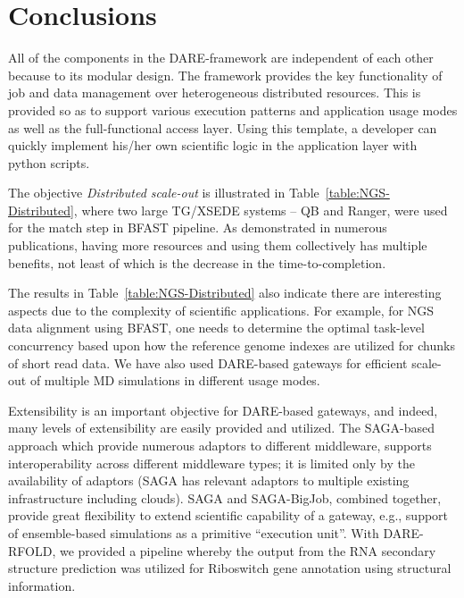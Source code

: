 \documentclass[]{svjour3}
\begin{document}
\section{Conclusions}

All of the components in the DARE-framework are independent of each
other because to its modular design. The framework provides the key
functionality of job and data management over heterogeneous
distributed resources. This is provided so as to support various
execution patterns and application usage modes as well as the
full-functional access layer. Using this template, a developer can
quickly implement his/her own scientific logic in the application
layer with python scripts.

The objective {\it Distributed scale-out} is illustrated in
Table~\ref{table:NGS-Distributed}, where two large TG/XSEDE systems -- QB
and Ranger, were used for the match step in BFAST pipeline. As
demonstrated in numerous publications, having more resources and using
them collectively has multiple benefits, not least of which is the
decrease in the time-to-completion.


The results in Table~\ref{table:NGS-Distributed} also indicate there
are interesting aspects due to the complexity of scientific
applications. For example, for NGS data alignment using BFAST, one
needs to determine the optimal task-level concurrency based upon how
the reference genome indexes are utilized for chunks of short read
data\cite{ecmls11}. We have also used DARE-based gateways for
efficient scale-out of multiple MD simulations in different usage
modes.



Extensibility is an important objective for DARE-based gateways, and
indeed, many levels of extensibility are easily provided and utilized.
The SAGA-based approach which provide numerous adaptors to different
middleware, supports interoperability across different middleware
types; it is limited only by the availability of adaptors (SAGA has
relevant adaptors to multiple existing infrastructure including
clouds). SAGA and SAGA-BigJob, combined together,
provide great flexibility to extend scientific capability of a
gateway, e.g., support of ensemble-based simulations as a primitive
``execution unit''. With DARE-RFOLD, we provided a pipeline whereby
the output from the RNA secondary structure prediction
was utilized for Riboswitch gene annotation using structural
information. %
\end{document}
